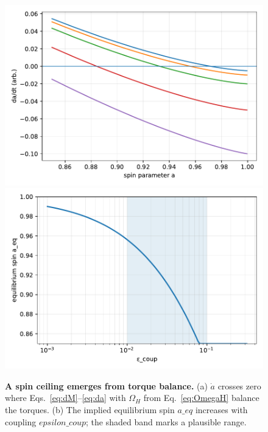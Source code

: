 \documentclass[twocolumn]{aastex701}
\newenvironment{CrowdedFloats}{%
  \begingroup
  \setcounter{topnumber}{1}%
  \setcounter{totalnumber}{2}%
}{\endgroup}
\newcommand{\epscoup}{\epsilon_{\rm coup}}
\newcommand{\aeq}{a_{\rm eq}}
\def\epscoup{epsilon\_coup}\def\aeq{a\_eq}\def\mathrm#1{#1}%
\begin{document}
\begin{CrowdedFloats}
\begin{figure}[!htbp]
  \vspace*{2pt}
  \centering
  \includegraphics[width=.95\linewidth]{Fig3a.pdf}\\[4pt]
  \includegraphics[width=.95\linewidth]{Fig3b.pdf}
  \caption{\textbf{A spin ceiling emerges from torque balance.}
  (a) $\dot a$ crosses zero where Eqs.~\eqref{eq:dM}--\eqref{eq:da} with $\Omega_H$ from Eq.~\eqref{eq:OmegaH} balance the torques. (b) The implied equilibrium spin $\aeq$ increases with coupling $\epscoup$; the shaded band marks a plausible range.}  \label{fig:fig3}
\end{figure}


\end{CrowdedFloats}
\end{document}
